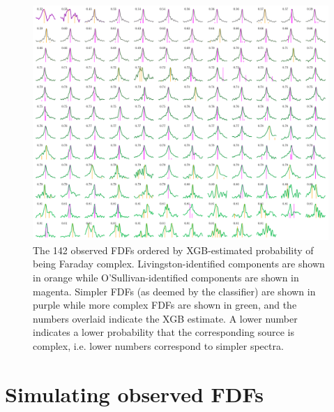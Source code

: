   \begin{figure}
    \centering
    \includegraphics[width=\linewidth]{faraday-images/both_spectra_xgb.pdf}
    \caption[The 142 observed FDFs ordered by XGB-estimated probability of being Faraday complex.]{The 142 observed FDFs ordered by XGB-estimated probability of being Faraday complex. Livingston-identified components are shown in orange while O'Sullivan-identified components are shown in magenta. Simpler FDFs (as deemed by the classifier) are shown in purple while more complex FDFs are shown in green, and the numbers overlaid indicate the XGB estimate. A lower number indicates a lower probability that the corresponding source is complex, i.e. lower numbers correspond to simpler spectra.}
    \label{fig:faraday-all-observed-fdfs-xgb}
  \end{figure}

\section{Simulating observed FDFs}
\label{sec:faraday-simulating}

